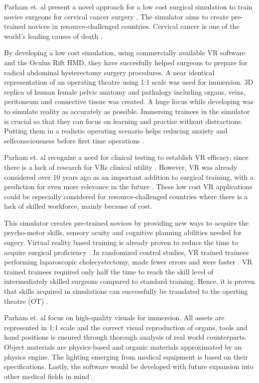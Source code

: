 Parham et. al present a novel approach for a low cost surgical simulation to train novice surgeons for cervical cancer surgery \cite{RN52}.
The simulator aims to create pre-trained novices in resource-challenged countries. 
Cervical cancer is one of the world's leading causes of death \cite{RN52}.

By developing a low cost simulation, using commercially available VR software and the Oculus Rift HMD, they have succesfully 
helped surgeons to prepare for radical abdominal hysterectomy surgery procedures.
A near identical representation of an operating theatre using 1:1 scale was used for immersion.
3D replica of human female pelvic anatomy and pathalogy including organs, veins, peritoneum and connective tissue was created.
A huge focus while developing was to simulate reality as accurately as possible. 
Immersing trainees in the simulator is crucial so that they can focus on learning and practise without distractions.
Putting them in a realistic operating scenario helps reducing anxiety and selfconsciousness before first time operations \cite{RN52}.

Parham et. al recognize a need for clinical testing to establish VR efficacy, since there is a lack of research for VRs clinical utility \cite{RN59}. 
However, VR was already considered over 10 years ago as an important addition to surgical training, with a prediction for even more relevance in the future \cite{RN60}.
These low cost VR applications could be especially considered for resource-challenged countries where there is a lack of skilled workforce, mainly because of cost.

This simulator creates pre-trained novices by providing new ways to acquire the psycho-motor skills, sensory acuity and cognitive planning abilities needed for sugery.
Virtual reality based training is already proven to reduce the time to acquire surgical proficiency \cite{RN61,RN62}. 
In randomized control studies, VR trained trainees performing laparoscopic cholecystectomy, made fewer errors and were faster \cite{RN63,RN64}.
VR trained trainees required only half the time to reach the skill level of intermediately skilled surgeons compared to standard training.
Hence, it is proven that skills acquired in simulations can successfully be translated to the operting theatre (OT) \cite{RN63,RN64}.

Parham et. al focus on high-quality visuals for immersion.
All assets are represented in 1:1 scale and the correct visual reproduction of organs, tools and hand positions is ensured through thorough analysis of real world counterparts.
Object materials are physics-based and organic materials approximated by an physics engine.
The lighting emerging from medical equipment is based on their specifications.
Lastly, the software would be developed with future expansion into other medical fields in mind \cite{RN52}.

